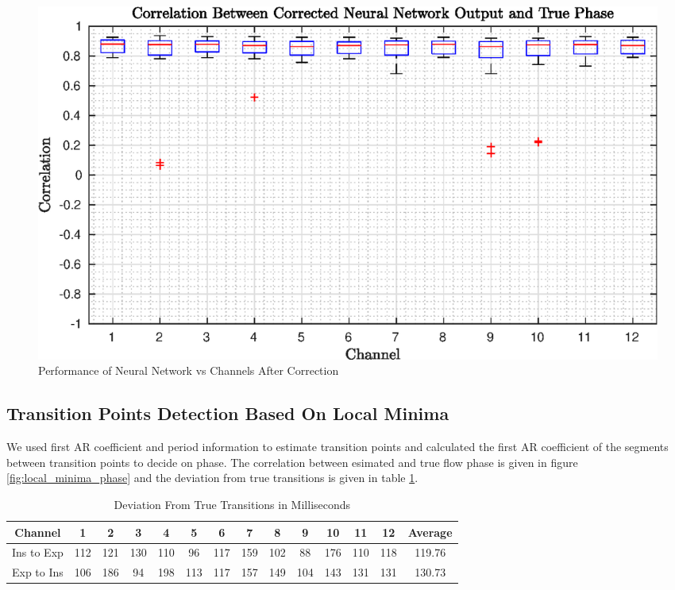 \begin{figure}
	\begin{center}
		\includegraphics[width=\textwidth]{figures/neur_net_corr_corrected.eps}
		\caption{Performance of Neural Network vs Channels After Correction}
		\label{fig:neur_net_corr_corrected}
	\end{center}
\end{figure}

\subsection{Transition Points Detection Based On Local Minima}
We used first AR coefficient and period information to estimate transition points and calculated the first AR coefficient of the segments between transition points to decide on phase. The correlation between esimated and true flow phase is given in figure \ref{fig:local_minima_phase} and the deviation from true transitions is given in table \ref{transition_deviation_minima}.
\begin{table}[h!]
	\centering
	\begin{tabular}{|| c c c c c c c c c c c c c c ||} 
		\hline
		Channel & 1 & 2 & 3 & 4 & 5 & 6 & 7 & 8 & 9 & 10 & 11 & 12 & Average \\ [0.5ex] 
		\hline\hline
		Ins to Exp & 112 & 121 & 130 & 110 & 96 & 117 & 159 & 102 & 88 & 176 & 110 & 118 & 119.76\\ 
		Exp to Ins & 106 & 186 & 94 & 198 & 113 & 117 & 157 & 149 & 104 & 143 & 131 & 131 & 130.73\\
		\hline
	\end{tabular}
	\caption{Deviation From True Transitions in Milliseconds}
	\label{transition_deviation_minima}
\end{table}

